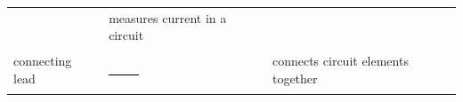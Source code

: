 \begin{center}
\begin{xtabular*}{\mytablewidth}[t]{|p{10\mystarwidth}|p{10\mystarwidth}|p{10\mystarwidth}|}
\begin{center}
      \vspace{2pt}
    \vspace{.1in}
    
    \end{center}



    \addtocounter{footnote}{-0}
    
                   &
    
    
        measures current in a circuit%
     \tabularnewline{}
    
    
        connecting lead &
    
    
        
                    
    \setcounter{subfigure}{0}

\label{m38516*id63163}
    \begin{center}
    \label{m38516*id63163!!!underscore!!!media}\label{m38516*id63163!!!underscore!!!printimage}\includegraphics[width=0.2\textwidth]{col11305.imgs/m38516_PG10C9_008.png} %
        
      \vspace{2pt}
    \vspace{.1in}
    
    \end{center}



    \addtocounter{footnote}{-0}
    
                   &
    
    
        connects circuit elements together%
     \tabularnewline{}
    \end{xtabular*}
      \end{center}
